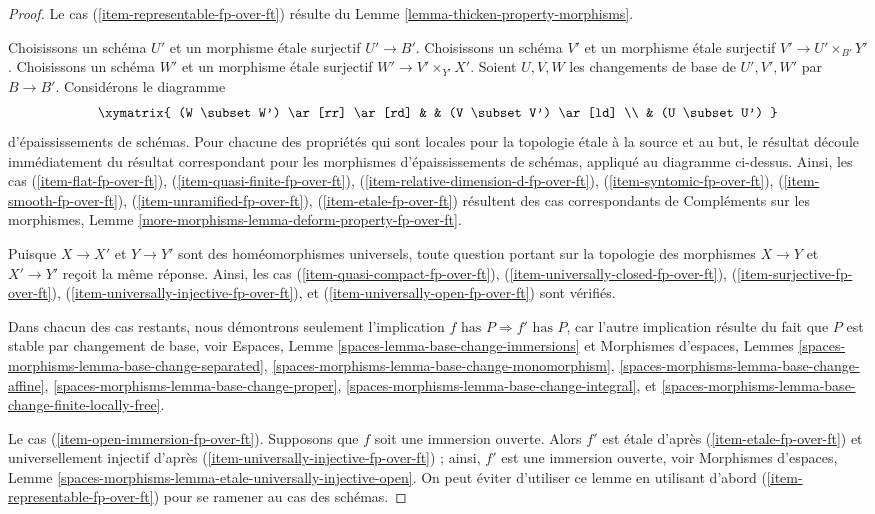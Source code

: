 \begin{proof}
Le cas (\ref{item-representable-fp-over-ft}) résulte du
Lemme \ref{lemma-thicken-property-morphisms}.

\medskip\noindent
Choisissons un schéma $U'$ et un morphisme étale surjectif $U' \to B'$.
Choisissons un schéma $V'$ et un morphisme étale surjectif
$V' \to U' \times_{B'} Y'$.
Choisissons un schéma $W'$ et un morphisme étale surjectif
$W' \to V' \times_{Y'} X'$. Soient $U, V, W$ les changements de base
de $U', V', W'$ par $B \to B'$. Considérons le diagramme
$$
\xymatrix{
(W \subset W') \ar[rr] \ar[rd] & & (V \subset V') \ar[ld] \\
& (U \subset U')
}
$$
d'épaississements de schémas. Pour chacune des propriétés qui sont
locales pour la topologie étale à la source et au but, le résultat découle immédiatement
du résultat correspondant pour les morphismes d'épaississements de schémas,
appliqué au diagramme ci-dessus. Ainsi, les cas
(\ref{item-flat-fp-over-ft}),
(\ref{item-quasi-finite-fp-over-ft}),
(\ref{item-relative-dimension-d-fp-over-ft}),
(\ref{item-syntomic-fp-over-ft}),
(\ref{item-smooth-fp-over-ft}),
(\ref{item-unramified-fp-over-ft}),
(\ref{item-etale-fp-over-ft})
résultent des cas correspondants de
Compléments sur les morphismes, Lemme \ref{more-morphisms-lemma-deform-property-fp-over-ft}.

\medskip\noindent
Puisque $X \to X'$ et $Y \to Y'$ sont des homéomorphismes universels,
toute question portant sur la topologie des morphismes
$X \to Y$ et $X' \to Y'$ reçoit la même réponse. Ainsi,
les cas (\ref{item-quasi-compact-fp-over-ft}),
(\ref{item-universally-closed-fp-over-ft}),
(\ref{item-surjective-fp-over-ft}),
(\ref{item-universally-injective-fp-over-ft}), et
(\ref{item-universally-open-fp-over-ft}) sont vérifiés.

\medskip\noindent
Dans chacun des cas restants, nous démontrons seulement l'implication
$f\text{ has }P \Rightarrow f'\text{ has }P$, car l'autre
implication résulte du fait que $P$ est stable par
changement de base, voir
Espaces, Lemme \ref{spaces-lemma-base-change-immersions} et
Morphismes d'espaces, Lemmes
\ref{spaces-morphisms-lemma-base-change-separated},
\ref{spaces-morphisms-lemma-base-change-monomorphism},
\ref{spaces-morphisms-lemma-base-change-affine},
\ref{spaces-morphisms-lemma-base-change-proper},
\ref{spaces-morphisms-lemma-base-change-integral}, et
\ref{spaces-morphisms-lemma-base-change-finite-locally-free}.

\medskip\noindent
Le cas (\ref{item-open-immersion-fp-over-ft}).
Supposons que $f$ soit une immersion ouverte.
Alors $f'$ est étale d'après (\ref{item-etale-fp-over-ft}) et universellement injectif
d'après (\ref{item-universally-injective-fp-over-ft}) ;
ainsi, $f'$ est une immersion ouverte, voir
Morphismes d'espaces, Lemme
\ref{spaces-morphisms-lemma-etale-universally-injective-open}.
On peut éviter d'utiliser ce lemme en
utilisant d'abord (\ref{item-representable-fp-over-ft}) pour se ramener au cas des schémas.


\end{proof}

